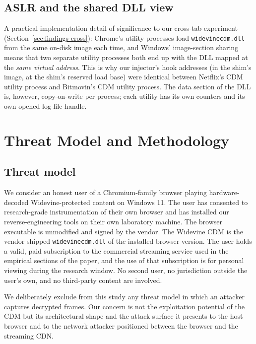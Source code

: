 \documentclass[11pt,letterpaper]{article}
\let\oldsection\section
\renewcommand{\section}{\clearpage\oldsection}
\begin{document}
\subsection{ASLR and the shared DLL view}
\label{sec:bg-aslr}

A practical implementation detail of significance to our cross-tab
experiment (Section~\ref{sec:findings-cross}): Chrome's utility
processes load \texttt{widevinecdm.dll} from the same on-disk image
each time, and Windows' image-section sharing means that two
separate utility processes both end up with the DLL mapped at the
\emph{same virtual address}. This is why our injector's hook
addresses (in the shim's image, at the shim's reserved load base)
were identical between Netflix's CDM utility process and Bitmovin's
CDM utility process. The data section of the DLL is, however,
copy-on-write per process; each utility has its own counters and
its own opened log file handle.

\section{Threat Model and Methodology}
\label{sec:threat}

\subsection{Threat model}
\label{sec:threat-model}

We consider an honest user of a Chromium-family browser playing
hardware-decoded Widevine-protected content on Windows 11. The user
has consented to research-grade instrumentation of their own browser
and has installed our reverse-engineering tools on their own
laboratory machine. The browser executable is unmodified and signed
by the vendor. The Widevine CDM is the vendor-shipped
\texttt{widevinecdm.dll} of the installed browser version. The user
holds a valid, paid subscription to the commercial streaming
service used in the empirical sections of the paper, and the use
of that subscription is for personal viewing during the research
window. No second user, no jurisdiction outside the user's own, and
no third-party content are involved.

We deliberately exclude from this study any threat model in which
an attacker captures decrypted frames. Our concern is not the
exploitation potential of the CDM but its architectural shape and
the attack surface it presents to the host browser and to the
network attacker positioned between the browser and the streaming
CDN.
\end{document}
